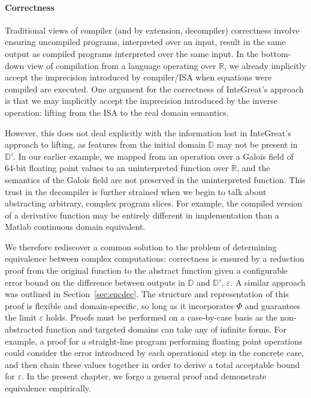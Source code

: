 \paragraph{Correctness}
Traditional views of compiler (and by extension, decompiler) correctness involve ensuring uncompiled programs, interpreted over an input, result in the same output as compiled programs interpreted over the same input.
In the bottom-down view of compilation from a language operating over $\mathbb{R}$, we already implicitly accept the imprecision introduced by compiler/ISA when equations were compiled are executed.
One argument for the correctness of InteGreat's approach is that we may implicitly accept the imprecision introduced by the inverse operation: lifting from the ISA to the real domain semantics.

However, this does not deal explicitly with the information lost in InteGreat's approach to lifting, as features from the initial domain $\mathbb{D}$ may not be present in $\mathbb{D}'$.
In our earlier example, we mapped from an operation over a Galois field of 64-bit floating point values to an uninterpreted function over $\mathbb{R}$, and the semantics of the Galois field are not preserved in the uninterpreted function.
This trust in the decompiler is further strained when we begin to talk about abstracting arbitrary, complex program slices.
For example, the compiled version of a derivative function may be entirely different in implementation than a Matlab continuous domain equivalent.

We therefore rediscover a common solution to the problem of determining equivalence between complex computations: correctness is ensured by a reduction proof from the original function to the abstract function given a configurable error bound on the difference between outputs in $\mathbb{D}$ and $\mathbb{D}'$, $\varepsilon$.
A similar approach was outlined in Section~\ref{sec:encdec}.
The structure and representation of this proof is flexible and domain-specific, so long as it incorporates $\Phi$ and guarantees the limit $\varepsilon$ holds.
Proofs must be performed on a case-by-case basis as the non-abstracted function and targeted domains can take any of infinite forms.
For example, a proof for a straight-line program performing floating point operations could consider the error introduced by each operational step in the concrete case, and then chain these values together in order to derive a total acceptable bound for $\varepsilon$.
In the present chapter, we forgo a general proof and demonstrate equivalence empirically.

